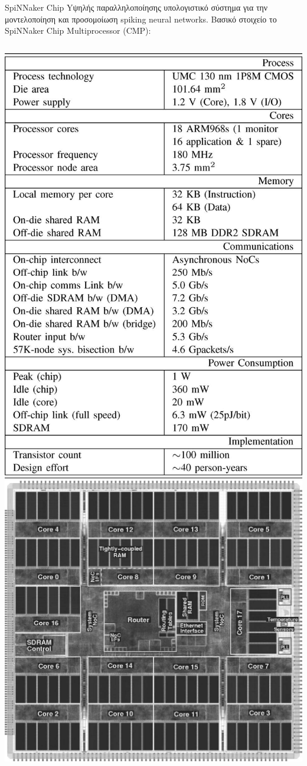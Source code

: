 \documentclass[11pt,center]{beamer}
\begin{document}
	
	\begin{frame}{SpiNNaker Chip}
		Yψηλής παραλληλοποίησης υπολογιστικό σύστημα για την μοντελοποίηση και προσομοίωση spiking 				neural networks.
		\pause
		\vfill
		Βασικό στοιχείο το SpiNNaker Chip Multiprocessor (CMP):
		\vfill
		\begin{columns}
			\includegraphics[width=0.75 \textwidth,right]{../pics/CMPspecs.jpg}
			\includegraphics[width=0.75 \textwidth,left]{../pics/CMP.jpg}
		\end{columns}
	\end{frame}
	
\end{document}
